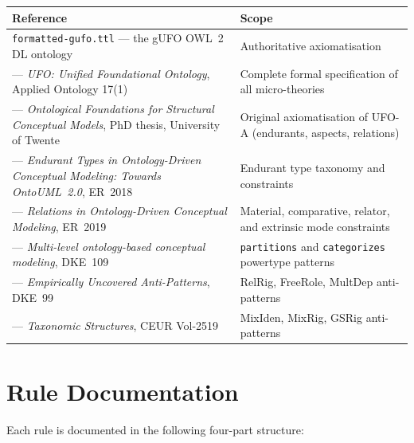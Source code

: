 \documentclass[12pt,a4paper]{article}
\begin{document}
\begin{longtable}{L{6cm} L{8cm}}
  \toprule
  \textbf{Reference} & \textbf{Scope} \\
  \midrule
  \endhead
  \texttt{formatted-gufo.ttl} --- the gUFO OWL~2 DL ontology
    & Authoritative axiomatisation \\[4pt]
  \citet{gufo2022} --- \textit{UFO: Unified Foundational Ontology},
    Applied Ontology 17(1)
    & Complete formal specification of all micro-theories \\[4pt]
  \citet{guizzardi2005} --- \textit{Ontological Foundations for Structural
    Conceptual Models}, PhD thesis, University of Twente
    & Original axiomatisation of UFO-A (endurants, aspects, relations) \\[4pt]
  \citet{guizzardi2018} --- \textit{Endurant Types in Ontology-Driven
    Conceptual Modeling: Towards OntoUML~2.0}, ER~2018
    & Endurant type taxonomy and constraints \\[4pt]
  \citet{fonseca2019} --- \textit{Relations in Ontology-Driven Conceptual
    Modeling}, ER~2019
    & Material, comparative, relator, and extrinsic mode constraints \\[4pt]
  \citet{carvalho2017} --- \textit{Multi-level ontology-based conceptual
    modeling}, DKE~109
    & \texttt{partitions} and \texttt{categorizes} powertype patterns \\[4pt]
  \citet{sales2015} --- \textit{Empirically Uncovered Anti-Patterns}, DKE~99
    & RelRig, FreeRole, MultDep anti-patterns \\[4pt]
  \citet{sales2019} --- \textit{Taxonomic Structures}, CEUR Vol-2519
    & MixIden, MixRig, GSRig anti-patterns \\
  \bottomrule
\end{longtable}

\section{Rule Documentation}

Each rule is documented in the following four-part structure:
\end{document}
